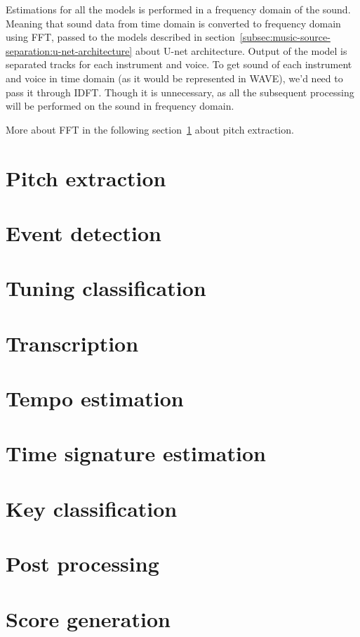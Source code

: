 Estimations for all the models is performed in a frequency domain of the sound. Meaning that sound data from time domain
is converted to frequency domain using \ac{FFT}, passed to the models described in section~\ref{subsec:music-source-separation:u-net-architecture}
about U-net architecture. Output of the model is separated tracks for each instrument and voice. To get sound of each
instrument and voice in time domain (as it would be represented in \ac{WAVE}), we'd need to pass it through \ac{IDFT}.
Though it is unnecessary, as all the subsequent processing will be performed on the sound in frequency domain.

More about \ac{FFT} in the following section~\ref{sec:pitch-extraction} about pitch extraction.

\section{Pitch extraction}\label{sec:pitch-extraction}

\section{Event detection}\label{sec:event-detection}

\section{Tuning classification}\label{sec:tunning-classification}

\section{Transcription}\label{sec:transcription}

\section{Tempo estimation}\label{sec:tempo-estimation}

\section{Time signature estimation}\label{sec:time-signature-estimation}

\section{Key classification}\label{sec:key-classification}

\section{Post processing}\label{sec:post-processing}

\section{Score generation}\label{sec:score-generation}



